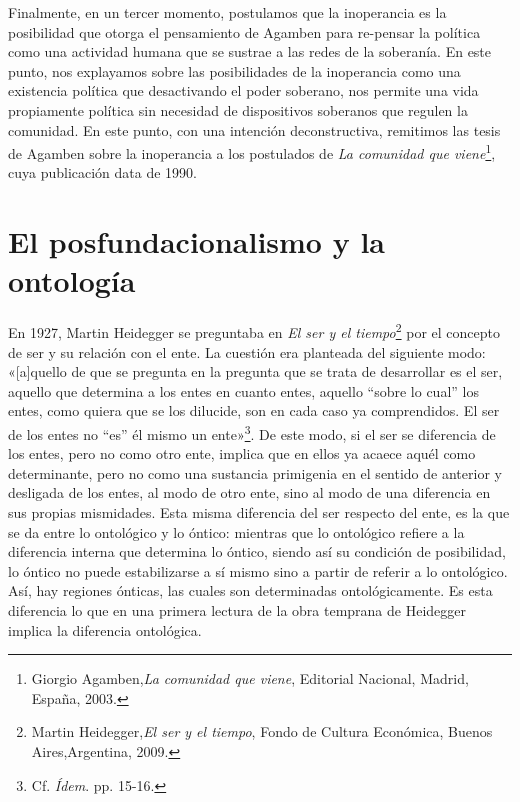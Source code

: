 Finalmente, en un tercer momento, postulamos que la inoperancia es la posibilidad que otorga el pensamiento de Agamben para re-pensar la política como una actividad humana que se sustrae a las redes de la soberanía. En este punto, nos explayamos sobre las posibilidades de la inoperancia como una existencia política que desactivando el poder soberano, nos permite una vida propiamente política sin necesidad de dispositivos soberanos que regulen la comunidad. En este punto, con una intención deconstructiva, remitimos las tesis de Agamben sobre la inoperancia a los postulados de \emph{La comunidad que viene}\footnote{Giorgio Agamben,\emph{La comunidad que viene}, Editorial Nacional, Madrid, España, 2003.}, cuya publicación data de 1990.

\section{El posfundacionalismo y la ontología}

En 1927, Martin Heidegger se preguntaba en \emph{El ser y el tiempo}\footnote{Martin Heidegger,\emph{El ser y el tiempo}, Fondo de Cultura Económica, Buenos Aires,Argentina, 2009.} por el concepto de ser y su relación con el ente. La cuestión era planteada del siguiente modo: «{[}a{]}quello de que se pregunta en la pregunta que se trata de desarrollar es el ser, aquello que determina a los entes en cuanto entes, aquello ``sobre lo cual'' los entes, como quiera que se los dilucide, son en cada caso ya comprendidos. El ser de los entes no ``es'' él mismo un ente»\footnote{Cf. \emph{Ídem}. pp. 15-16.}. De este modo, si el ser se diferencia de los entes, pero no como otro ente, implica que en ellos ya acaece aquél como determinante, pero no como una sustancia primigenia en el sentido de anterior y desligada de los entes, al modo de otro ente, sino al modo de una diferencia en sus propias mismidades. Esta misma diferencia del ser respecto del ente, es la que se da entre lo ontológico y lo óntico: mientras que lo ontológico refiere a la diferencia interna que determina lo óntico, siendo así su condición de posibilidad, lo óntico no puede estabilizarse a sí mismo sino a partir de referir a lo ontológico. Así, hay regiones ónticas, las cuales son determinadas ontológicamente. Es esta diferencia lo que en una primera lectura de la obra temprana de Heidegger implica la diferencia ontológica.

